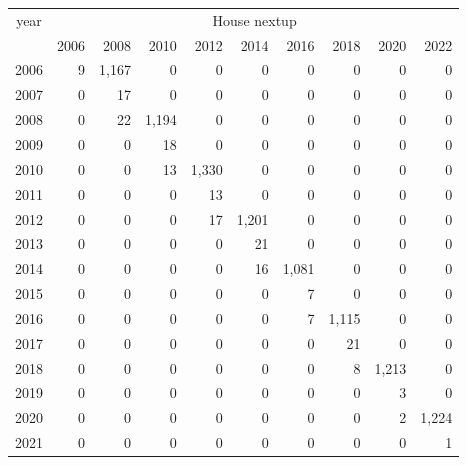 \footnotesize\begin{tabular}[t]{lrrrrrrrrr}
\toprule
\multicolumn{1}{c}{year} & \multicolumn{9}{c}{House nextup} \\
\cmidrule(l{3pt}r{3pt}){1-1} \cmidrule(l{3pt}r{3pt}){2-10}
  & 2006 & 2008 & 2010 & 2012 & 2014 & 2016 & 2018 & 2020 & 2022\\
\midrule
2006 & 9 & 1,167 & 0 & 0 & 0 & 0 & 0 & 0 & 0\\
2007 & 0 & 17 & 0 & 0 & 0 & 0 & 0 & 0 & 0\\
2008 & 0 & 22 & 1,194 & 0 & 0 & 0 & 0 & 0 & 0\\
2009 & 0 & 0 & 18 & 0 & 0 & 0 & 0 & 0 & 0\\
2010 & 0 & 0 & 13 & 1,330 & 0 & 0 & 0 & 0 & 0\\
2011 & 0 & 0 & 0 & 13 & 0 & 0 & 0 & 0 & 0\\
2012 & 0 & 0 & 0 & 17 & 1,201 & 0 & 0 & 0 & 0\\
2013 & 0 & 0 & 0 & 0 & 21 & 0 & 0 & 0 & 0\\
2014 & 0 & 0 & 0 & 0 & 16 & 1,081 & 0 & 0 & 0\\
2015 & 0 & 0 & 0 & 0 & 0 & 7 & 0 & 0 & 0\\
2016 & 0 & 0 & 0 & 0 & 0 & 7 & 1,115 & 0 & 0\\
2017 & 0 & 0 & 0 & 0 & 0 & 0 & 21 & 0 & 0\\
2018 & 0 & 0 & 0 & 0 & 0 & 0 & 8 & 1,213 & 0\\
2019 & 0 & 0 & 0 & 0 & 0 & 0 & 0 & 3 & 0\\
2020 & 0 & 0 & 0 & 0 & 0 & 0 & 0 & 2 & 1,224\\
2021 & 0 & 0 & 0 & 0 & 0 & 0 & 0 & 0 & 1\\
\bottomrule
\end{tabular}
